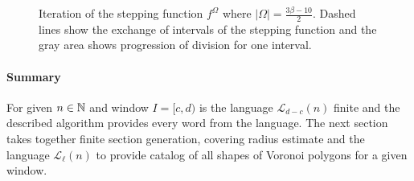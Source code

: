 \documentclass[text.tex]{subfiles}
\begin{document}
\begin{figure}
\begin{center}
\end{center}
\label{pic:iteration}
\caption{Iteration of the stepping function $f^{\Omega}$ where $|\Omega| = \frac{3\beta-10}{2}$. Dashed lines show the exchange of intervals of the stepping function and the gray area shows progression of division for one interval.} 
\end{figure}

\paragraph{Summary}
For given $n\in\mathbb{N}$ and window $I=[c,d)$ is the language $\mathcal{L}_{d-c}(n)$ finite and the described algorithm provides every word from the language. The next section takes together finite section generation, covering radius estimate and the language $\mathcal{L}_{\ell}(n)$ to provide catalog of all shapes of Voronoi polygons for a given window.
\end{document}
